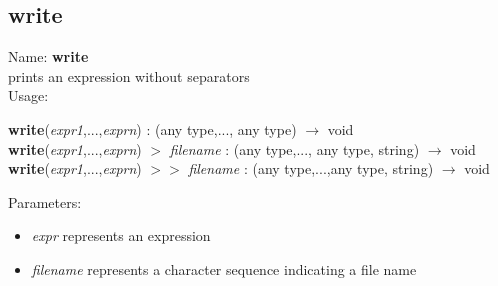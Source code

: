 \subsection{write}
\label{labwrite}
\noindent Name: \textbf{write}\\
prints an expression without separators\\
\noindent Usage: 
\begin{center}
\textbf{write}(\emph{expr1},...,\emph{exprn}) : (\textsf{any type},..., \textsf{any type}) $\rightarrow$ \textsf{void}\\
\textbf{write}(\emph{expr1},...,\emph{exprn}) $>$ \emph{filename} : (\textsf{any type},..., \textsf{any type}, \textsf{string}) $\rightarrow$ \textsf{void}\\
\textbf{write}(\emph{expr1},...,\emph{exprn}) $>>$ \emph{filename} : (\textsf{any type},...,\textsf{any type}, \textsf{string}) $\rightarrow$ \textsf{void}\\
\end{center}
Parameters: 
\begin{itemize}
\item \emph{expr} represents an expression
\item \emph{filename} represents a character sequence indicating a file name
\end{itemize}
